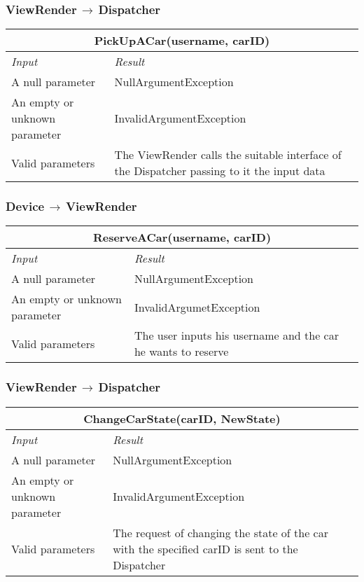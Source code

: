 \documentclass[11pt,a4paper]{report}
\begin{document}
\subsubsection{ViewRender$\,\to\,$Dispatcher}
\begin{tabularx}{\textwidth}{|X|X|}
	\hline
	\multicolumn{2}{|c|}{\textbf{PickUpACar(username, carID)}}\\
	\hline
	\textit{Input} & \textit{Result}\\
	\hline
	A null parameter & NullArgumentException\\
	\hline
	An empty or unknown parameter & InvalidArgumentException\\
	\hline
	Valid parameters &  The ViewRender calls the suitable interface of the Dispatcher passing to it the input data\\
	\hline
\end{tabularx}
\subsubsection{Device$\,\to\,$ViewRender}
\begin{tabularx}{\textwidth}{|X|X|}
	\hline
	\multicolumn{2}{|c|}{\textbf{ReserveACar(username, carID)}}\\
	\hline
	\textit{Input} & \textit{Result}\\
	\hline
	A null parameter & NullArgumentException\\
	\hline
	An empty or unknown parameter & InvalidArgumetException\\
	\hline
	Valid parameters & The user inputs his username and the car he wants to reserve\\
	\hline
\end{tabularx}
\subsubsection{ViewRender$\,\to\,$Dispatcher}
\begin{tabularx}{\textwidth}{|X|X|}
	\hline
	\multicolumn{2}{|c|}{\textbf{ChangeCarState(carID, NewState)}}\\
	\hline
	\textit{Input} & \textit{Result}\\
	\hline
	A null parameter & NullArgumentException\\
	\hline
	An empty or unknown parameter & InvalidArgumentException\\
	\hline
	Valid parameters & The request of changing the state of the car with the specified carID is sent to the Dispatcher\\
	\hline
\end{tabularx}
\end{document}
